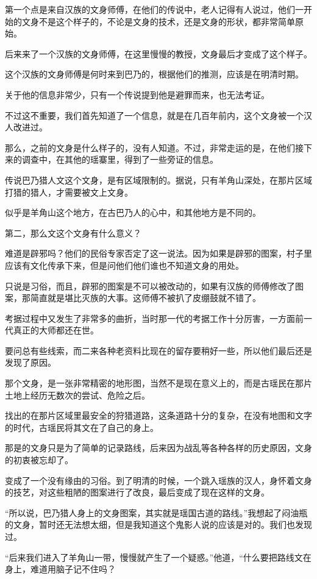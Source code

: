 第一个点是来自汉族的文身师傅，在他们的传说中，老人记得有人说过，他们一开始的文身不是这个样子的，不论是文身的技术，还是文身的形状，都非常简单原始。

后来来了一个汉族的文身师傅，在这里慢慢的教授，文身最后才变成了这个样子。

这个汉族的文身师傅是何时来到巴乃的，根据他们的推测，应该是在明清时期。

关于他的信息非常少，只有一个传说提到他是避罪而来，也无法考证。

不过这不重要，我们首先知道了一个信息，就是在几百年前内，这个文身被一个汉人改进过。

那么，之前的文身是什么样子的，没有人知道。不过，非常走运的是，在他们接下来的调查中，在其他的瑶寨里，得到了一些旁证的信息。

传说巴乃猎人文这个文身，是有区域限制的。据说，只有羊角山深处，在那片区域打猎的猎人，才需要被文上文身。

似乎是羊角山这个地方，在古巴乃人的心中，和其他地方是不同的。

第二，那么文这个文身有什么意义？

难道是辟邪吗？他们的民俗专家否定了这一说法。因为如果是辟邪的图案，村子里应该有文化传承下来，但是问他们他们谁也不知道文身的用处。

只说是习俗，而且，辟邪的图案是不可以被改动的，如果有汉族的师傅修改了图案，那简直就是堪比灭族的大事。这师傅不被扒了皮绷鼓就不错了。

考据过程中又发生了非常多的曲折，当时那一代的考据工作十分厉害，一方面前一代真正的大师都还在世。

要问总有些线索，而二来各种老资料比现在的留存要稍好一些，所以他们最后还是发现了原因。

那个文身，是一张非常精密的地形图，当然不是现在意义上的，而是古瑶民在那片土地上经历无数次的尝试、危险之后。

找出的在那片区域里最安全的狩猎道路，这条道路十分的复杂，在没有地图和文字的时代，古瑶民将其文在了自己的身上。

那是的文身只是为了简单的记录路线，后来因为战乱等各种各样的历史原因，文身的初衷被忘却了。

变成了一个没有缘由的习俗。到了明清的时候，一个跳入瑶族的汉人，身怀着文身的技艺，对这些粗陋的图案进行了改良，最后变成了现在这样的文身。

“所以说，巴乃猎人身上的文身图案，其实就是瑶国古道的路线。”我想起了闷油瓶的文身，暂时还无法想太细，但是我知道这个鬼影人说的应该是对的。我们也发现过。

“后来我们进入了羊角山一带，慢慢就产生了一个疑惑。”他道，“什么要把路线文在身上，难道用脑子记不住吗？

